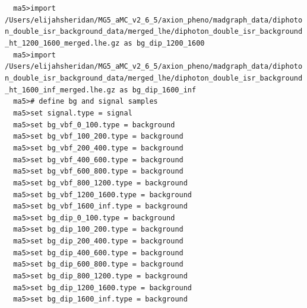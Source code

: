 \documentclass[a4paper, 10pt]{article}
\begin{document}
\texttt{ }\texttt{ }\texttt{ma5>import /\-Users/\-elijahsheridan/\-MG5\_aMC\_v2\_6\_5/\-axion\_pheno/\-madgraph\_data/\-diphoton\_double\_isr\_background\_data/\-merged\_lhe/\-diphoton\_double\_isr\_background\_ht\_1200\_1600\_merged.lhe.gz as bg\_dip\_1200\_1600\\
}
\texttt{ }\texttt{ }\texttt{ma5>import /\-Users/\-elijahsheridan/\-MG5\_aMC\_v2\_6\_5/\-axion\_pheno/\-madgraph\_data/\-diphoton\_double\_isr\_background\_data/\-merged\_lhe/\-diphoton\_double\_isr\_background\_ht\_1600\_inf\_merged.lhe.gz as bg\_dip\_1600\_inf\\
}
\texttt{ }\texttt{ }\texttt{ma5>\# define bg and signal samples\\
}
\texttt{ }\texttt{ }\texttt{ma5>set signal.type = signal\\
}
\texttt{ }\texttt{ }\texttt{ma5>set bg\_vbf\_0\_100.type = background\\
}
\texttt{ }\texttt{ }\texttt{ma5>set bg\_vbf\_100\_200.type = background\\
}
\texttt{ }\texttt{ }\texttt{ma5>set bg\_vbf\_200\_400.type  = background\\
}
\texttt{ }\texttt{ }\texttt{ma5>set bg\_vbf\_400\_600.type  = background\\
}
\texttt{ }\texttt{ }\texttt{ma5>set bg\_vbf\_600\_800.type  = background\\
}
\texttt{ }\texttt{ }\texttt{ma5>set bg\_vbf\_800\_1200.type  = background\\
}
\texttt{ }\texttt{ }\texttt{ma5>set bg\_vbf\_1200\_1600.type  = background\\
}
\texttt{ }\texttt{ }\texttt{ma5>set bg\_vbf\_1600\_inf.type = background\\
}
\texttt{ }\texttt{ }\texttt{ma5>set bg\_dip\_0\_100.type = background\\
}
\texttt{ }\texttt{ }\texttt{ma5>set bg\_dip\_100\_200.type = background\\
}
\texttt{ }\texttt{ }\texttt{ma5>set bg\_dip\_200\_400.type = background\\
}
\texttt{ }\texttt{ }\texttt{ma5>set bg\_dip\_400\_600.type = background\\
}
\texttt{ }\texttt{ }\texttt{ma5>set bg\_dip\_600\_800.type = background\\
}
\texttt{ }\texttt{ }\texttt{ma5>set bg\_dip\_800\_1200.type = background\\
}
\texttt{ }\texttt{ }\texttt{ma5>set bg\_dip\_1200\_1600.type = background\\
}
\texttt{ }\texttt{ }\texttt{ma5>set bg\_dip\_1600\_inf.type = background\\
}
\end{document}
